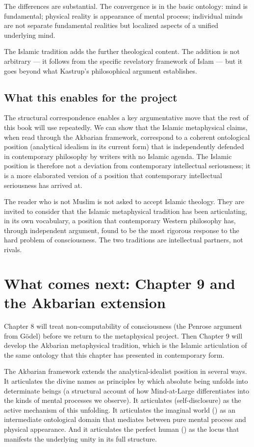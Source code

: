 The differences are substantial. The convergence is in the basic
ontology: mind is fundamental; physical reality is appearance of
mental process; individual minds are not separate fundamental
realities but localized aspects of a unified underlying mind.

The Islamic tradition adds the further theological content. The
addition is not arbitrary --- it follows from the specific
revelatory framework of Islam --- but it goes beyond what Kastrup's
philosophical argument establishes.

\subsection{What this enables for the project}

The structural correspondence enables a key argumentative move that
the rest of this book will use repeatedly. We can show that the
Islamic metaphysical claims, when read through the Akbarian
framework, correspond to a coherent ontological position
(analytical idealism in its current form) that is independently
defended in contemporary philosophy by writers with no Islamic
agenda. The Islamic position is therefore not a deviation from
contemporary intellectual seriousness; it is a more elaborated
version of a position that contemporary intellectual seriousness has
arrived at.

The reader who is not Muslim is not asked to accept Islamic
theology. They are invited to consider that the Islamic
metaphysical tradition has been articulating, in its own
vocabulary, a position that contemporary Western philosophy has,
through independent argument, found to be the most rigorous response
to the hard problem of consciousness. The two traditions are
intellectual partners, not rivals.

\section{What comes next: Chapter 9 and the Akbarian extension}
\label{sec:idealism-ahead}

Chapter 8 will treat non-computability of consciousness (the
Penrose argument from G\"odel) before we return to the metaphysical
project. Then Chapter 9 will develop the Akbarian metaphysical
tradition, which is the Islamic articulation of the same ontology
that this chapter has presented in contemporary form.

The Akbarian framework extends the analytical-idealist position in
several ways. It articulates the divine names as principles by
which absolute being unfolds into determinate beings (a structural
account of how Mind-at-Large differentiates into the kinds of
mental processes we observe). It articulates 
(self-disclosure) as the active mechanism of this unfolding. It
articulates the imaginal world () as an
intermediate ontological domain that mediates between pure mental
process and physical appearance. And it articulates the perfect
human () as the locus that manifests the
underlying unity in its full structure.

